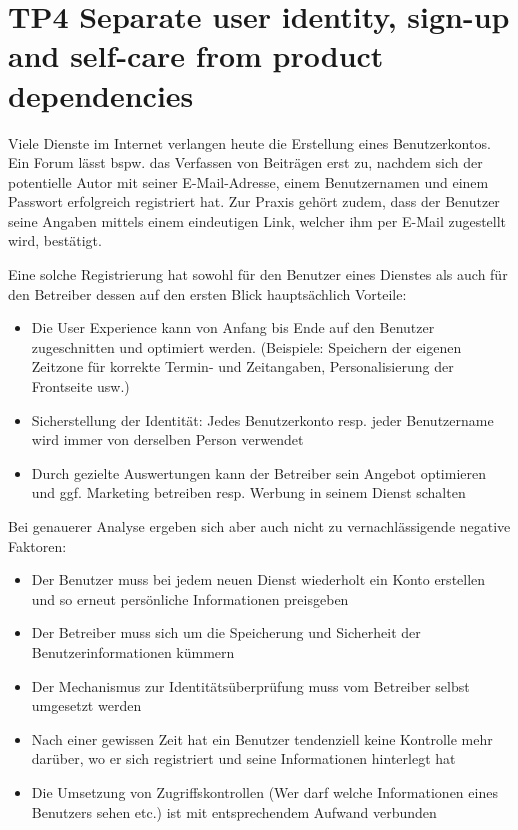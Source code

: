 \section{TP4 Separate user identity, sign-up and self-care from product dependencies}
\label{sec:principle-tp4-seperate-user-identity}

Viele Dienste im Internet verlangen heute die Erstellung eines Benutzerkontos. Ein Forum lässt bspw. das Verfassen von Beiträgen erst zu, nachdem sich der potentielle Autor mit seiner E-Mail-Adresse, einem Benutzernamen und einem Passwort erfolgreich registriert hat. Zur Praxis gehört zudem, dass der Benutzer seine Angaben mittels einem eindeutigen Link, welcher ihm per E-Mail zugestellt wird, bestätigt.

Eine solche Registrierung hat sowohl für den Benutzer eines Dienstes als auch für den Betreiber dessen auf den ersten Blick hauptsächlich Vorteile:

\begin{itemize}
	\item Die User Experience kann von Anfang bis Ende auf den Benutzer zugeschnitten und optimiert werden. (Beispiele: Speichern der eigenen Zeitzone für korrekte Termin- und Zeitangaben, Personalisierung der Frontseite usw.)
	\item Sicherstellung der Identität: Jedes Benutzerkonto resp. jeder Benutzername wird immer von derselben Person verwendet
	\item Durch gezielte Auswertungen kann der Betreiber sein Angebot optimieren und ggf. Marketing betreiben resp. Werbung in seinem Dienst schalten
\end{itemize}

Bei genauerer Analyse ergeben sich aber auch nicht zu vernachlässigende negative Faktoren:

\begin{itemize}
	\item Der Benutzer muss bei jedem neuen Dienst wiederholt ein Konto erstellen und so erneut persönliche Informationen preisgeben
	\item Der Betreiber muss sich um die Speicherung und Sicherheit der Benutzerinformationen kümmern
	\item Der Mechanismus zur Identitätsüberprüfung muss vom Betreiber selbst umgesetzt werden
	\item Nach einer gewissen Zeit hat ein Benutzer tendenziell keine Kontrolle mehr darüber, wo er sich registriert und seine Informationen hinterlegt hat
	\item Die Umsetzung von Zugriffskontrollen (Wer darf welche Informationen eines Benutzers sehen etc.) ist mit entsprechendem Aufwand verbunden
\end{itemize}

